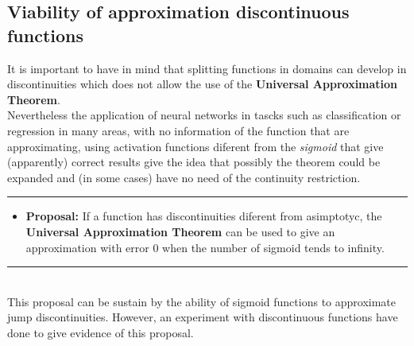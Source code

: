 \documentclass[a4paper, 11pt]{article}
\begin{document}
\subsection{Viability of approximation discontinuous functions}
It is important to have in mind that splitting functions in domains can develop in discontinuities which does not allow the use of the \textbf{Universal Approximation Theorem}.\\
Nevertheless the application of neural networks in tascks such as classification or regression in many areas, with no information of the function that are approximating, using activation functions diferent from the \textit{sigmoid} that give (apparently) correct results give the idea that possibly the theorem could be expanded and (in some cases) have no need of the continuity restriction.\\
\rule{\linewidth}{0.4pt}
\begin{itemize}
    \item \textbf{Proposal:} If a function has discontinuities diferent from asimptotyc, the \textbf{Universal Approximation Theorem} can be used to give an approximation with error 0 when the number of sigmoid tends to infinity.
\end{itemize}
\rule{\linewidth}{0.4pt}\\ \vspace{0.5em}
This proposal can be sustain by the ability of sigmoid functions to approximate jump discontinuities. However, an experiment with discontinuous functions have done to give evidence of this proposal.
\end{document}
